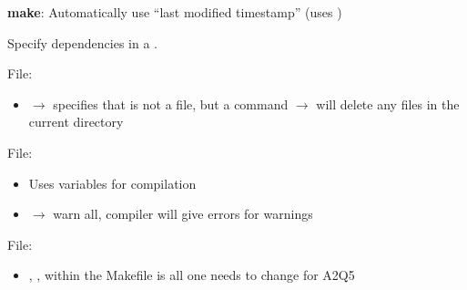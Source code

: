 \textbf{make}: Automatically use ``last modified timestamp'' (uses )

Specify dependencies in a .


File: 
\begin{itemize}
    \item {} $ \rightarrow $ specifies that  is not a file, but
    a command
    \subitem {} $ \rightarrow $  will delete any  files
    in the current directory
\end{itemize}

File: 
\begin{itemize}
    \item Uses variables for compilation
    \item {} $ \rightarrow $ warn all, compiler will give errors for warnings
\end{itemize}

File: 
\begin{itemize}
    \item {}, ,  within
    the Makefile is all one needs to change for A2Q5
\end{itemize}